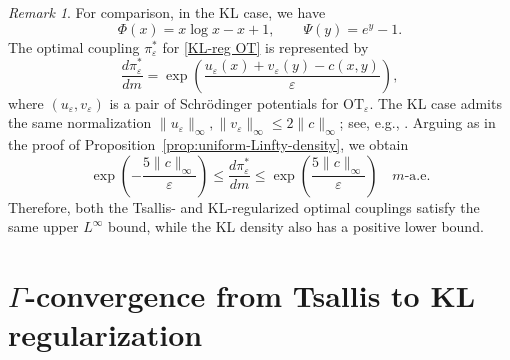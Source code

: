 \documentclass[a4paper,11pt]{article}
\theoremstyle{plain}
\theoremstyle{definition}
\theoremstyle{remark}
\newtheorem{rem}[thm]{Remark}
\theoremstyle{plain}
\numberwithin{equation}{section}
\newcommand{\ep}{\varepsilon}
\newcommand{\1}{\mbox{1}\hspace{-0.25em}\mbox{l}} %
\begin{document}
\begin{rem}
For comparison, in the KL case, we have
\begin{equation*}
\Phi(x) = x \log x -x + 1,
\qquad
\Psi(y) = e^y - 1.
\end{equation*}
The optimal coupling $\pi_\ep^*$ for \eqref{KL-reg OT} is represented by
\begin{equation*}
\frac{d\pi_\ep^*}{dm}
= \exp\left( \frac{u_\ep(x) + v_\ep(y) - c(x,y)}{\ep} \right),
\end{equation*}
where $(u_\ep, v_\ep)$ is a pair of Schr\"odinger potentials for $\mathrm{OT}_\ep$. The KL case admits the same normalization $\|u_\ep\|_\infty,\|v_\ep\|_\infty\leq2\|c\|_\infty$; see, e.g., \cite{di2020optimal}. Arguing as in the proof of Proposition~\ref{prop:uniform-Linfty-density}, we obtain
\begin{equation*}
\exp\left(-\frac{5\|c\|_\infty}{\ep}\right)
\leq\frac{d\pi_\ep^*}{dm}
\leq\exp\left(\frac{5\|c\|_\infty}{\ep}\right)
\quad m\text{-a.e.}
\end{equation*}
Therefore, both the Tsallis- and KL-regularized optimal couplings satisfy the same upper $L^\infty$ bound, while the KL density also has a positive lower bound.
\end{rem}

\section{$\Gamma$-convergence from Tsallis to KL regularization}\label{sec:Gamma convergence}
\end{document}
